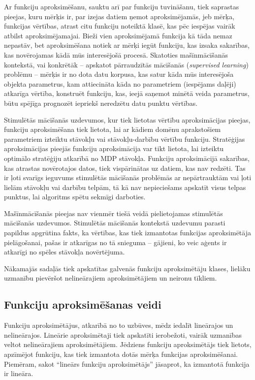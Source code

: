 \documentclass{ludis} %
\begin{document}
Ar funkciju aproksimēšanu, sauktu arī par funkciju tuvināšanu, tiek saprastas
pieejas, kuru mērķis ir, par izejas datiem ņemot aproksimējamās, jeb mērķa,
funkcijas vērtības, atrast citu funkciju noteiktā klasē, kas pēc iespējas vairāk
atbilst aproksimējamajai. Bieži vien aproksimējamā funkcija kā tāda nemaz
nepastāv, bet aproksimēšana notiek ar mērķi iegūt funkciju, kas izsaka
sakarības, kas novērojamas kādā mūs interesējošā procesā. Skatoties
mašīnmācīšanās kontekstā, vai konkrētāk -- apskatot pārraudzītās mācīšanās
(\textit{supervised learning}) problēmu -- mērķis ir no dota datu korpusa, kas
satur kāda mūs interesējoša objekta parametrus, kam attiecināta kāda no
parametriem (iespējams daļēji) atkarīga vērtība, konstruēt funkciju, kas, ieejā
saņemot minētā veida parametrus, būtu spējīga prognozēt iepriekš neredzētu datu
punktu vērtības.

Stimulētās mācīšanās uzdevumos, kur tiek lietotas vērtību aproksimācijas
pieejas, funkciju aproksimēšana tiek lietota, lai ar kādiem domēnu aprakstošiem
parametriem izteiktu stāvokļu vai stāvokļu-darbību vērtību funkciju. Stratēģijas
aproksimācijas pieejās funkciju aproksimācija var tikt lietota, lai izteiktu
optimālo stratēģiju atkarībā no MDP stāvokļa. Funkciju aproksimācijā sakarības,
kas atrastas novērotajos datos, tiek vispārinātas uz datiem, kas nav redzēti.
Tas ir ļoti svarīgs ieguvums stimulētās mācīšanās problēmās ar nepārtrauktām vai
ļoti lielām stāvokļu vai darbību telpām, tā kā nav nepieciešams apskatīt visus
telpas punktus, lai algoritms spētu sekmīgi darboties.

Mašīnmācīšanās pieejas nav vienmēr tiešā veidā pielietojamas stimulētās
mācīšanās uzdevumos. Stimulētās mācīšanās kontekstā uzdevumu parasti papildus
apgrūtina fakts, ka vērtības, kas tiek izmantotas funkcijas aproksimētāja
pielāgošanai, pašas ir atkarīgas no tā snieguma -- gājieni, ko veic aģents ir
atkarīgi no spēles stāvokļa novērtējuma.

Nākamajās sadaļās tiek apskatītas galvenās funkciju aproksimētāju klases,
lielāku uzmanību pievēršot nelineārajiem aproksimētājiem un neironu tīkliem.

\subsection{Funkciju aproksimēšanas veidi}
Funkciju aproksimētājus, atkarībā no to uzbūves, mēdz iedalīt lineārajos un
nelineārajos. Lineārie aproksimētaji tiek apskatīti ierobežoti, vairāk uzmanības
veltot nelineārajiem aproksimētājiem. Jēdziens funkciju aproksimētājs tiek
lietots, apzīmējot funkciju, kas tiek izmantota dotās mērķa funkcijas
aproksimēšanai. Piemēram, sakot ``lineārs funkciju aproksimētājs'' jāsaprot, ka
izmantotā funkcija ir lineāra.
\end{document}
